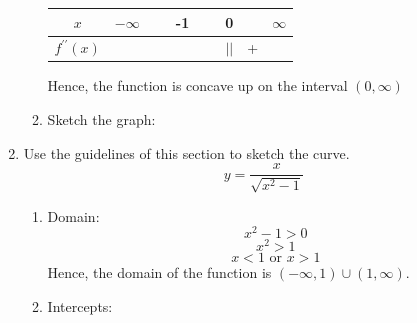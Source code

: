 \documentclass[12pt]{article}
\begin{document}
\begin{enumerate}
\begin{enumerate}
\begin{center}
                \begin{tabular}{c c c c c c c c}
                    $x$ & $-\infty$ & ~ & -1 & ~ & 0 & ~ &$\infty$ \\ 
                    \hline 
                    $f^{\prime\prime} (x)$ & ~ & ~ & ~ & ~ & $||$ & + \\ 
                \end{tabular}    
            \end{center}
            Hence, the function is concave up on the interval $(0,\infty)$
        \newpage
        \item Sketch the graph:
        \begin{figure}[!h]
            \centering
            \begin{framed}
            \end{framed}
        \end{figure}
    \end{enumerate}
    \setcounter{enumi}{27}
    \item Use the guidelines of this section to sketch the curve.
        \[y = \frac{x}{\sqrt{x^2 - 1}}\]
        \begin{enumerate}
            \item Domain:
                \[x^2 - 1 > 0\]
                \[x^2 > 1\]
                \[x < 1\text{ or } x > 1\]
                Hence, the domain of the function is $(-\infty,1)\cup (1, \infty)$.
            \item Intercepts:

\end{enumerate}
\end{enumerate}
\end{document}
